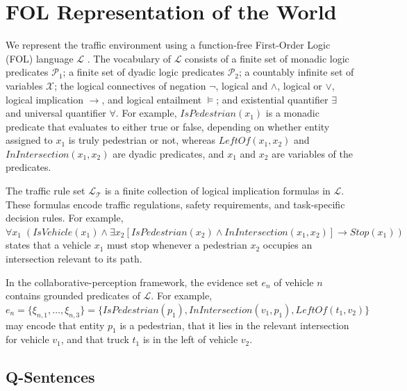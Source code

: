 \documentclass[10pt, conference, letterpaper]{ IEEEtran}
\theoremstyle{bfnote}
\begin{document}
\section{FOL Representation of the World}
\label{sec:fol-representation}

We represent the traffic environment using a function-free First-Order Logic
(FOL) language $\mathcal{L}$ \cite{nelte}. The vocabulary of
$\mathcal{L}$ consists of a finite set of monadic logic predicates
$\mathcal{P}_1$; a finite set of dyadic logic predicates
$\mathcal{P}_2$; a countably infinite set of variables $\mathcal{X}$; the
logical connectives of negation $\neg$, logical and $\land$, logical or $\lor$, logical implication $\rightarrow$, and logical entailment $\models$; and existential quantifier
$\exists$ and universal quantifier $\forall$. For example,
$\mathit{IsPedestrian}(x_1)$ is a monadic predicate that evaluates to either true or false, depending on whether entity assigned to $x_1$ is truly pedestrian or not, whereas
$\mathit{LeftOf}(x_1,x_2)$ and $\mathit{InIntersection}(x_1,x_2)$ are dyadic
predicates, and $x_1$ and $x_2$ are variables of the predicates.

The traffic rule set $\mathcal{L}_{\mathcal{T}}$ is a finite collection of logical implication formulas
in $\mathcal{L}$. These formulas encode traffic regulations, safety
requirements, and task-specific decision rules. For example,
$
\forall x_1\;(
    \mathit{IsVehicle}(x_1)
    \land
    \exists x_2[
        \mathit{IsPedestrian}(x_2)
        \land
        \mathit{InIntersection}(x_1,x_2)
    ]
    \rightarrow
    \mathit{Stop}(x_1)
)
$
states that a vehicle $x_1$ must stop whenever a pedestrian $x_2$ occupies an
intersection relevant to its path.

In the collaborative-perception framework, the evidence set $e_n$ of
vehicle $n$ contains grounded predicates of $\mathcal{L}$. For example,
$
    e_n
    =
    \{\xi_{n,1},\ldots,\xi_{n,3}\} =
    \{\mathit{IsPedestrian}(p_1),
    \mathit{InIntersection}(v_1,p_1),
    \mathit{LeftOf}(t_1,v_2)\}
$
may encode that entity $p_1$ is a pedestrian, that it lies in the relevant
intersection for vehicle $v_1$, and that truck $t_1$ is in the left of vehicle $v_2$.

\subsection{Q-Sentences}
\end{document}
